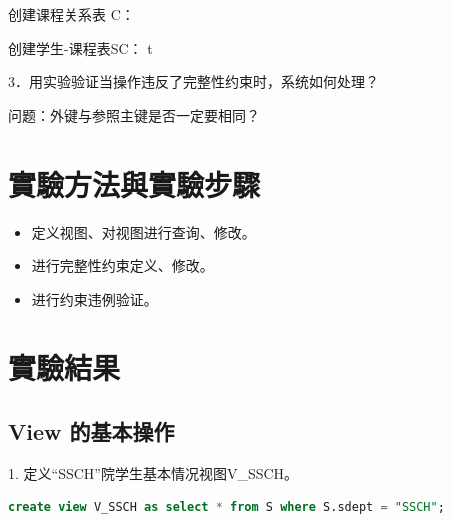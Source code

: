 \documentclass[12pt, a4paper]{report}
\begin{document}
创建课程关系表 C：

\begin{figure}[H] %
    \centering %
\end{figure}

创建学生-课程表SC：
t
\begin{figure}[H] %
    \centering %
\end{figure}

3．用实验验证当操作违反了完整性约束时，系统如何处理？

问题：外键与参照主键是否一定要相同？

\section{實驗方法與實驗步驟}

\begin{itemize}
    \item 定义视图、对视图进行查询、修改。
    \item 进行完整性约束定义、修改。
    \item 进行约束违例验证。
\end{itemize}

\section{實驗結果}

\subsection{View 的基本操作}

1. 定义“SSCH”院学生基本情况视图V\_SSCH。\\

\begin{lstlisting}[language=SQL]
    create view V_SSCH as select * from S where S.sdept = "SSCH";
\end{lstlisting}
\end{document}

